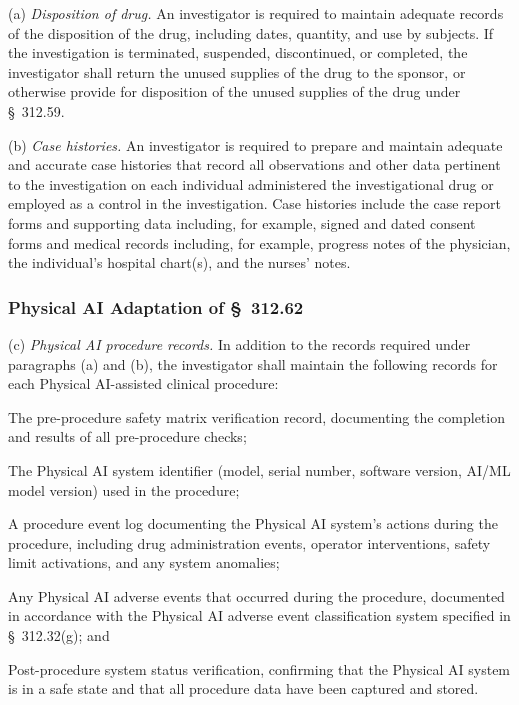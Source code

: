 \documentclass[11pt]{article}
\begin{document}
(a) \textit{Disposition of drug.} An investigator is required to maintain adequate records of the disposition of the drug, including dates, quantity, and use by subjects. If the investigation is terminated, suspended, discontinued, or completed, the investigator shall return the unused supplies of the drug to the sponsor, or otherwise provide for disposition of the unused supplies of the drug under \S~312.59.

(b) \textit{Case histories.} An investigator is required to prepare and maintain adequate and accurate case histories that record all observations and other data pertinent to the investigation on each individual administered the investigational drug or employed as a control in the investigation. Case histories include the case report forms and supporting data including, for example, signed and dated consent forms and medical records including, for example, progress notes of the physician, the individual's hospital chart(s), and the nurses' notes.

\subsubsection{Physical AI Adaptation of \S~312.62}

(c) \textit{Physical AI procedure records.} In addition to the records required under paragraphs (a) and (b), the investigator shall maintain the following records for each Physical AI-assisted clinical procedure:

\begin{description}[leftmargin=0.8cm,style=sameline]
\item[(i)] The pre-procedure safety matrix verification record, documenting the completion and results of all pre-procedure checks;
\item[(ii)] The Physical AI system identifier (model, serial number, software version, AI/ML model version) used in the procedure;
\item[(iii)] A procedure event log documenting the Physical AI system's actions during the procedure, including drug administration events, operator interventions, safety limit activations, and any system anomalies;
\item[(iv)] Any Physical AI adverse events that occurred during the procedure, documented in accordance with the Physical AI adverse event classification system specified in \S~312.32(g); and
\item[(v)] Post-procedure system status verification, confirming that the Physical AI system is in a safe state and that all procedure data have been captured and stored.
\end{description}
\end{document}
